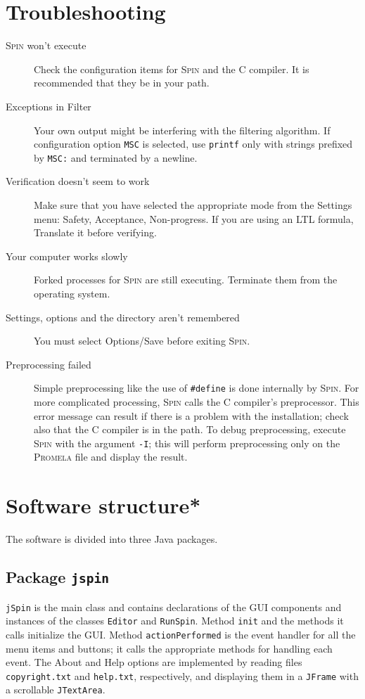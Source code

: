 \documentclass[11pt]{article}
\newcommand{\spn}{\textsc{Spin}}
\newcommand{\prm}{\textsc{Promela}}
\newcommand{\p}[1]{\texttt{#1}}
\newcommand{\bu}[1]{\textsf{#1}}
\begin{document}
\section{Troubleshooting}
\begin{description}
\item[\spn{} won't execute] Check the configuration items
for \spn{} and the C compiler.
It is recommended that they be in your path.
\item[Exceptions in Filter] Your own output might be
interfering with the filtering algorithm.
If configuration option \p{MSC} is selected, use \p{printf} only with strings
prefixed by \p{MSC:} and terminated by a newline.
\item[Verification doesn't seem to work]
Make sure that you have selected the appropriate mode
from the \bu{Settings} menu:
\bu{Safety}, \bu{Acceptance}, \bu{Non-progress}.
If you are using an LTL formula,
\bu{Translate} it before verifying.
\item[Your computer works slowly] Forked processes for \spn{} are still executing.
Terminate them from the operating system.
\item[Settings, options and the directory aren't remembered]
You must select \bu{Options/Save} before exiting \spn{}.
\item[Preprocessing failed] Simple preprocessing like the use of \verb=#define= 
is done internally by \spn{}. For more complicated processing, \spn{} calls the 
C compiler's preprocessor. This error message can result if there is a problem
with the installation; check also that the C compiler is in the path.
To debug preprocessing, execute \spn{} with the argument \p{-I};
this will perform preprocessing only on the \prm{} file and display the result. 
\end{description}


\section{Software structure*}
The software is divided into three Java packages.

\subsection{Package \p{jspin}}
\p{jSpin} is the main class and contains declarations
of the GUI components and instances
of the classes \p{Editor} and \p{RunSpin}.
Method \p{init} and the methods it calls initialize the GUI.
Method \p{action\-Per\-formed} is the event handler for all the menu items
and buttons; it calls the appropriate methods for handling each event.
The \bu{About} and \bu{Help} options are implemented by reading files
\p{copyright.txt} and \p{help.txt}, respectively, and displaying
them in a \p{JFrame} with a scrollable \p{JTextArea}.
\end{document}
